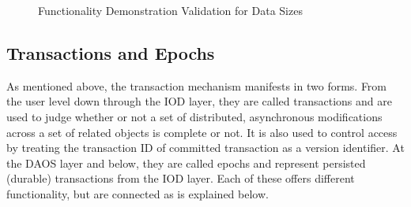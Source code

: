 \documentclass{sig-alt-gov2}
\begin{document}
\begin{figure}[htbp!]
\centering
\vspace{-0.10in}
\vspace{-0.10in}
\caption{Functionality Demonstration Validation for Data Sizes}
\label{fig:eval-size}
\vspace{-0.05in}
\end{figure}

\subsection{Transactions and Epochs}
\label{sec:transactions}

As mentioned above, the transaction mechanism manifests in two forms. From the
user level down through the IOD layer, they are called transactions and are
used to judge whether or not a set of distributed, asynchronous modifications
across a set of related objects is complete or not.  It is also used to control
access by treating the transaction ID of committed transaction as a version
identifier.  At the DAOS layer and below, they are called epochs and represent
persisted (durable) transactions from the IOD layer. Each of these offers
different functionality, but are connected as is explained below.
\end{document}
